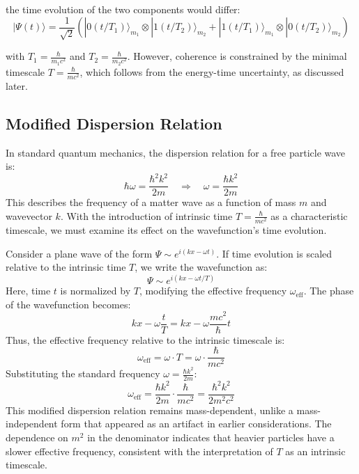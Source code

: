 \documentclass{article}
\begin{document}
	the time evolution of the two components would differ:
	\begin{equation}
		|\Psi(t)\rangle = \frac{1}{\sqrt{2}}(|0(t/T_1)\rangle_{m_1} \otimes |1(t/T_2)\rangle_{m_2} + |1(t/T_1)\rangle_{m_1} \otimes |0(t/T_2)\rangle_{m_2})
	\end{equation}
	
	with $T_1 = \frac{\hbar}{m_1 c^2}$ and $T_2 = \frac{\hbar}{m_2 c^2}$. However, coherence is constrained by the minimal timescale $T = \frac{\hbar}{mc^2}$, which follows from the energy-time uncertainty, as discussed later.
	
	\subsection{Modified Dispersion Relation}
	
	In standard quantum mechanics, the dispersion relation for a free particle wave is:
	\begin{equation}
		\hbar \omega = \frac{\hbar^2 k^2}{2m} \quad \Rightarrow \quad \omega = \frac{\hbar k^2}{2m}
	\end{equation}
	This describes the frequency of a matter wave as a function of mass $m$ and wavevector $k$. With the introduction of intrinsic time $T = \frac{\hbar}{mc^2}$ as a characteristic timescale, we must examine its effect on the wavefunction's time evolution.
	
	Consider a plane wave of the form $\Psi \sim e^{i(kx - \omega t)}$. If time evolution is scaled relative to the intrinsic time $T$, we write the wavefunction as:
	\begin{equation}
		\Psi \sim e^{i(kx - \omega t / T)}
	\end{equation}
	Here, time $t$ is normalized by $T$, modifying the effective frequency $\omega_{\text{eff}}$. The phase of the wavefunction becomes:
	\begin{equation}
		kx - \omega \frac{t}{T} = kx - \omega \frac{mc^2}{\hbar} t
	\end{equation}
	Thus, the effective frequency relative to the intrinsic timescale is:
	\begin{equation}
		\omega_{\text{eff}} = \omega \cdot T = \omega \cdot \frac{\hbar}{mc^2}
	\end{equation}
	Substituting the standard frequency $\omega = \frac{\hbar k^2}{2m}$:
	\begin{equation}
		\omega_{\text{eff}} = \frac{\hbar k^2}{2m} \cdot \frac{\hbar}{mc^2} = \frac{\hbar^2 k^2}{2 m^2 c^2}
	\end{equation}
	This modified dispersion relation remains mass-dependent, unlike a mass-independent form that appeared as an artifact in earlier considerations. The dependence on $m^2$ in the denominator indicates that heavier particles have a slower effective frequency, consistent with the interpretation of $T$ as an intrinsic timescale.
	
\end{document}
